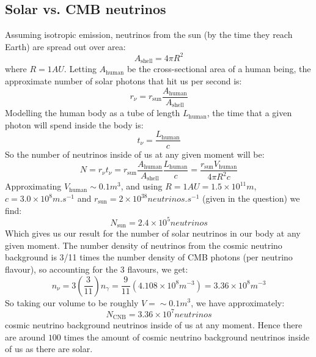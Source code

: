 \subsection{Solar vs. CMB neutrinos}
Assuming isotropic emission, neutrinos from the sun (by the time they reach Earth) are spread out over area:
\begin{equation}
    A_{\text{shell}} = 4\pi R^2
\end{equation}
where $R = 1 \si{AU}$. Letting $A_{\text{human}}$ be the cross-sectional area of a human being, the approximate number of solar photons that hit us per second is:
\begin{equation}
    r_{\nu} = r_{\text{sun}}\frac{A_{\text{human}}}{A_{\text{shell}}}
\end{equation}
Modelling the human body as a tube of length $L_{\text{human}}$, the time that a given photon will spend inside the body is:
\begin{equation}
    t_{\nu} = \frac{L_{\text{human}}}{c}
\end{equation}
So the number of neutrinos inside of us at any given moment will be:
\begin{equation}
    N = r_{\nu}t_{\nu} =  r_{\text{sun}}\frac{A_{\text{human}}}{A_{\text{shell}}}\frac{L_{\text{human}}}{c} = \frac{r_{\text{sun}}V_{\text{human}}}{4\pi R^2 c}
\end{equation}
Approximating $V_{\text{human}} \sim 0.1\si{m^3}$, and using $R = 1 \si{AU} = 1.5 \times 10^{11}\si{m}$, $c = 3.0\times 10^{8}\si{m.s^{-1}}$ and $r_{\text{sun}} = 2 \times 10^{38}\si{neutrinos.s^{-1}}$ (given in the question) we find:
\begin{equation}
    \boxed{N_{\text{sun}} = 2.4 \times 10^{5} \si{neutrinos}}
\end{equation}
Which gives us our result for the number of solar neutrinos in our body at any given moment. The number density of neutrinos from the cosmic neutrino background is 3/11 times the number density of CMB photons (per neutrino flavour), so accounting for the 3 flavours, we get:
\begin{equation}
    n_\nu = 3\left(\frac{3}{11}\right)n_\gamma = \frac{9}{11}(4.108 \times 10^{8}\si{m^{-3}}) = 3.36 \times 10^8 \si{m^{-3}}
\end{equation}
So taking our volume to be roughly $V = \sim 0.1\si{m^3}$, we have approximately:
\begin{equation}
    \boxed{N_{\text{CNB}} = 3.36 \times 10^7\si{neutrinos}}
\end{equation}
cosmic neutrino background neutrinos inside of us at any moment. Hence there are around $\boxed{\text{100 times}}$ the amount of cosmic neutrino background neutrinos inside of us as there are solar.